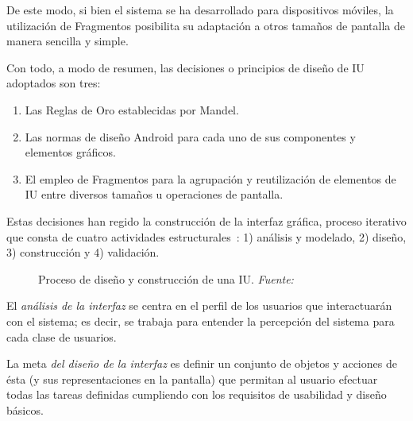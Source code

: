 De este modo, si bien el sistema se ha desarrollado para dispositivos móviles, la utilización de Fragmentos posibilita su adaptación a otros tamaños de pantalla de manera sencilla y simple.

Con todo, a modo de resumen, las decisiones o principios de diseño de IU adoptados son tres:

\begin{enumerate}
	\item{Las Reglas de Oro establecidas por Mandel}.
	\item{Las normas de diseño Android para cada uno de sus componentes y elementos gráficos}.
	\item{El empleo de Fragmentos para la agrupación y reutilización de elementos de IU entre diversos tamaños u operaciones de pantalla}.
\end{enumerate}

Estas decisiones han regido la construcción de la interfaz gráfica, proceso iterativo que consta de cuatro actividades estructurales~\cite{Man97}: 1) análisis y modelado, 2) diseño, 3) construcción y 4) validación.

\begin{figure} [!htb]
	\centering
	\caption[Proceso de diseño y construcción de una IU]{Proceso de diseño y construcción de una IU. \textit{Fuente:~\cite{Pre10}}}
	\label{fig:disenoIU}
\end{figure}

El \emph{análisis de la interfaz} se centra en el perfil de los usuarios que interactuarán con el sistema; es decir, se trabaja para entender la percepción del sistema para cada clase de usuarios.

La meta \emph{del diseño de la interfaz} es definir un conjunto de objetos y acciones de ésta (y sus representaciones en la pantalla) que permitan al usuario efectuar todas las tareas definidas cumpliendo con los requisitos de usabilidad y diseño básicos.

